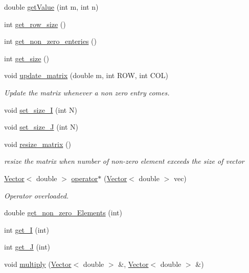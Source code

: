 \begin{DoxyCompactItemize}
double \hyperlink{class_sparse_matrix_a73c1386e4a8c0bcd5794388ab466b653}{get\+Value} (int m, int n)
\item 
int \hyperlink{class_sparse_matrix_ae0da8b29c003e7c86922fbbe5ac4cf37}{get\+\_\+row\+\_\+size} ()
\item 
int \hyperlink{class_sparse_matrix_a17952677da3e9d5ba5251d9c88b525d2}{get\+\_\+non\+\_\+zero\+\_\+enteries} ()
\item 
int \hyperlink{class_sparse_matrix_a853aa94295ebeec1b72aaee542b1e6bf}{get\+\_\+size} ()
\item 
void \hyperlink{class_sparse_matrix_a1317a1d66aa80814ba177429ce2873e1}{update\+\_\+matrix} (double m, int R\+O\+W, int C\+O\+L)
\begin{DoxyCompactList}\small\item\em Update the matrix whenever a non zero entry comes. \end{DoxyCompactList}\item 
void \hyperlink{class_sparse_matrix_afa19deb4d52146d5fb938d43d4eb896d}{set\+\_\+size\+\_\+\+I} (int N)
\item 
void \hyperlink{class_sparse_matrix_acd4fd555b1a73dd1e5448b41b9026d54}{set\+\_\+size\+\_\+\+J} (int N)
\item 
void \hyperlink{class_sparse_matrix_a486aee279efaf3f2bdf7d9529d99cf32}{resize\+\_\+matrix} ()
\begin{DoxyCompactList}\small\item\em resize the matrix when number of non-\/zero element exceeds the size of vector \end{DoxyCompactList}\item 
\hyperlink{class_vector}{Vector}$<$ double $>$ \hyperlink{class_sparse_matrix_aef1b60f3004d7b4d686d8f267ab02de9}{operator$\ast$} (\hyperlink{class_vector}{Vector}$<$ double $>$ vec)
\begin{DoxyCompactList}\small\item\em Operator overloaded. \end{DoxyCompactList}\item 
double \hyperlink{class_sparse_matrix_a6ca05f8e391c80f7e2cb33a9e0801eeb}{get\+\_\+non\+\_\+zero\+\_\+\+Elements} (int)
\item 
int \hyperlink{class_sparse_matrix_a39da3940234cffada544a89556812ba3}{get\+\_\+\+I} (int)
\item 
int \hyperlink{class_sparse_matrix_a0bef0481e55d37959087534701b971d2}{get\+\_\+\+J} (int)
\item 
void \hyperlink{class_sparse_matrix_ad67080fca9273a1660f55e6e0b8b6a2d}{multiply} (\hyperlink{class_vector}{Vector}$<$ double $>$ \&, \hyperlink{class_vector}{Vector}$<$ double $>$ \&)

\end{DoxyCompactItemize}
